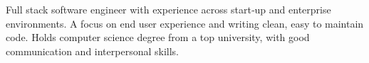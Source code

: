 

\begin{cvparagraph}

Full stack software engineer with experience across start‑up and enterprise environments. A focus on end user experience and writing clean, easy
to maintain code. Holds computer science degree from a top university, with good communication and interpersonal skills.
\end{cvparagraph}

